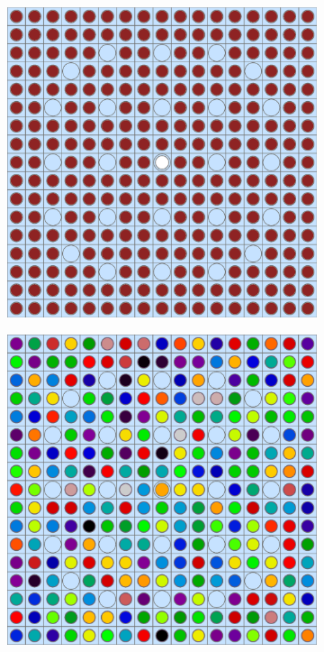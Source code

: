 \begin{figure}[h!]
\centering
\begin{subfigure}{.45\textwidth}
  \centering
  \includegraphics[width=0.87\linewidth]{figures/quantification/homogenization/assm-16-null-materials}
  \caption{}
  \label{fig:chap8-assm-16-null-materials}
\end{subfigure}%
\begin{subfigure}{.45\textwidth}
  \centering
  \includegraphics[width=0.87\linewidth]{figures/quantification/homogenization/assm-16-degenerate-materials}

\end{subfigure}
\end{figure}
